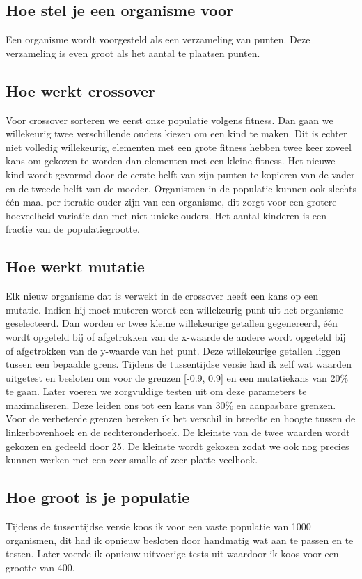 \documentclass[a4paper]{article}
\begin{document}
\subsection{Hoe stel je een organisme voor}
Een organisme wordt voorgesteld als een verzameling van punten. Deze verzameling is even groot als het aantal te plaatsen punten.
\subsection{Hoe werkt crossover}
Voor crossover sorteren we eerst onze populatie volgens fitness. Dan gaan we willekeurig twee verschillende ouders kiezen om een kind te maken. Dit is echter niet volledig willekeurig, elementen met een grote fitness hebben twee keer zoveel kans om gekozen te worden dan elementen met een kleine fitness. Het nieuwe kind wordt gevormd door de eerste helft van zijn punten te kopieren van de vader en de tweede helft van de moeder. Organismen in de populatie kunnen ook slechts \'e\'en maal per iteratie ouder zijn van een organisme, dit zorgt voor een grotere hoeveelheid variatie dan met niet unieke ouders. Het aantal kinderen is een fractie van de populatiegrootte.
\subsection{Hoe werkt mutatie}
Elk nieuw organisme dat is verwekt in de crossover heeft een kans op een mutatie. Indien hij moet muteren wordt een willekeurig punt uit het organisme geselecteerd. Dan worden er twee kleine willekeurige getallen gegenereerd, \'e\'en wordt opgeteld bij of afgetrokken van de x-waarde de andere wordt opgeteld bij of afgetrokken van de y-waarde van het punt. Deze willekeurige getallen liggen tussen een bepaalde grens. Tijdens de tussentijdse versie had ik zelf wat waarden uitgetest en besloten om voor de grenzen [-0.9, 0.9] en een mutatiekans van 20\% te gaan. Later voeren we zorgvuldige testen uit om deze parameters te maximaliseren. Deze leiden ons tot een kans van 30\% en aanpasbare grenzen. Voor de verbeterde grenzen bereken ik het verschil in breedte en hoogte tussen de linkerbovenhoek en de rechteronderhoek. De kleinste van de twee waarden wordt gekozen en gedeeld door 25. De kleinste wordt gekozen zodat we ook nog precies kunnen werken met een zeer smalle of zeer platte veelhoek.
\subsection{Hoe groot is je populatie}
Tijdens de tussentijdse versie koos ik voor een vaste populatie van 1000 organismen, dit had ik opnieuw besloten door handmatig wat aan te passen en te testen. Later voerde ik opnieuw uitvoerige tests uit waardoor ik koos voor een grootte van 400.
\end{document}
